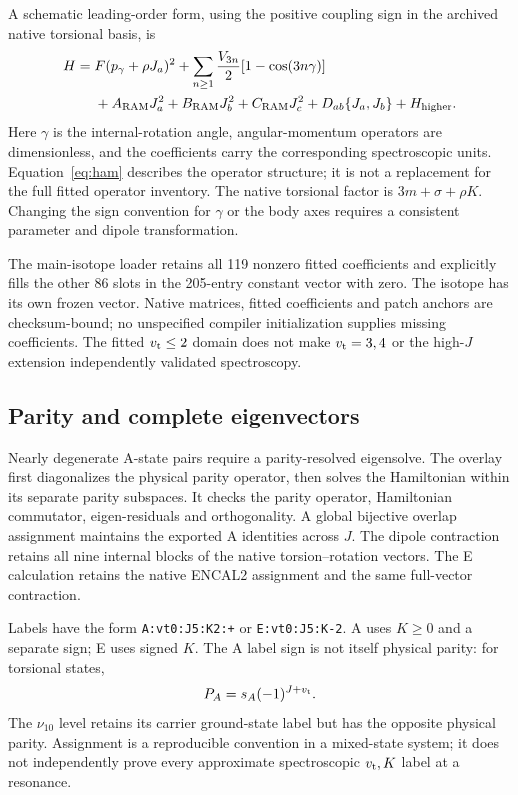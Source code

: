 \documentclass[11pt,a4paper]{article}
\newcommand{\vt}{v_{\rm t}}
\begin{document}
A schematic leading-order form, using the positive coupling sign in the
archived native torsional basis, is
\begin{align}
H={}&F(p_\gamma+\rho J_a)^2+
\sum_{n\ge1}\frac{V_{3n}}{2}[1-\cos(3n\gamma)]\nonumber\\
&+A_{\rm RAM}J_a^2+B_{\rm RAM}J_b^2+C_{\rm RAM}J_c^2
+D_{ab}\{J_a,J_b\}+H_{\rm higher}.
\label{eq:ham}
\end{align}
Here $\gamma$ is the internal-rotation angle, angular-momentum operators are
dimensionless, and the coefficients carry the corresponding spectroscopic
units. Equation~\eqref{eq:ham} describes the operator structure; it is not a
replacement for the full fitted operator inventory. The native torsional
factor is $3m+\sigma+\rho K$. Changing the sign convention for $\gamma$ or
the body axes requires a consistent parameter and dipole transformation.

The main-isotope loader retains all 119 nonzero fitted coefficients and
explicitly fills the other 86 slots in the 205-entry constant vector with
zero. The isotope has its own frozen vector. Native matrices, fitted
coefficients and patch anchors are checksum-bound; no unspecified compiler
initialization supplies missing coefficients. The fitted $\vt\le2$ domain
does not make $\vt=3,4$ or the high-$J$ extension independently validated
spectroscopy.

\subsection{Parity and complete eigenvectors}
Nearly degenerate A-state pairs require a parity-resolved eigensolve.
The overlay first diagonalizes the physical parity operator, then solves
the Hamiltonian within its separate parity subspaces. It checks the parity
operator, Hamiltonian commutator, eigen-residuals and orthogonality. A global
bijective overlap assignment maintains the exported A identities across $J$.
The dipole contraction retains all nine internal blocks of the native
torsion--rotation vectors. The E calculation retains the native ENCAL2
assignment and the same full-vector contraction.

Labels have the form \texttt{A:vt0:J5:K2:+} or
\texttt{E:vt0:J5:K-2}. A uses $K\ge0$ and a separate sign; E uses signed
$K$. The A label sign is not itself physical parity: for torsional states,
\begin{equation}
P_A=s_A(-1)^{J+\vt}.
\end{equation}
The $\nu_{10}$ level retains its carrier ground-state label but has the
opposite physical parity. Assignment is a reproducible convention in a
mixed-state system; it does not independently prove every approximate
spectroscopic $\vt,K$ label at a resonance.
\end{document}
